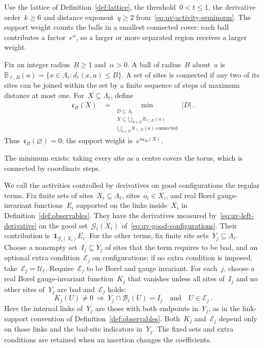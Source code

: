 Use the lattice of Definition~\ref{def:lattice}, the threshold~$0<t\le1$, the derivative order~$k\ge6$ and distance exponent~$q\ge2$ from~\eqref{eq:uv-activity-seminorm}.
The support weight counts the balls in a smallest connected cover: each ball contributes a factor~$e^\alpha$, so a larger or more separated region receives a larger weight.

\begin{definition}\label{def:uv-covers}
Fix an integer radius~$B\ge1$ and~$\alpha>0$.
A ball of radius~$B$ about~$a$ is~$\mathbb B_{\ell,B}(a)=\{x\in\Lambda_\ell:d_\ell(x,a)\le B\}$.
A set of sites is connected if any two of its sites can be joined within the set by a finite sequence of steps of maximum distance at most one.
For~$X\subseteq\Lambda_\ell$, define
\begin{equation}\label{eq:uv-cover-number}
 \begin{aligned}
 \mathfrak c_B(X)&=\min_{\substack{D\subseteq\Lambda_\ell\\
                    X\subseteq\bigcup_{a\in D}\mathbb B_{\ell,B}(a)\\
                    \bigcup_{a\in D}\mathbb B_{\ell,B}(a)\ \mathrm{connected}}}|D|\,.
 \end{aligned}
\end{equation}
Thus~$\mathfrak c_B(\varnothing)=0$; the support weight is~$e^{\alpha\mathfrak c_B(X)}$.
\end{definition}

The minimum exists: taking every site as a centre covers the torus, which is connected by coordinate steps.

We call the activities controlled by derivatives on good configurations the regular terms.
Fix finite sets of sites~$X_i\subseteq\Lambda_\ell$, sites~$o_i\in X_i$, and real Borel gauge-invariant functions~$E_i$ supported on the links inside~$X_i$ in Definition~\ref{def:observables}.
They have the derivatives measured by~\eqref{eq:uv-left-derivative} on the good set~$\mathcal G_t(X_i)$ of~\eqref{eq:uv-good-configurations}.
Their contribution is~$\mathbf1_{\mathcal G_t(X_i)}E_i$.
For the other terms, fix finite site sets~$Y_j\subseteq\Lambda_\ell$. Choose a nonempty set~$I_j\subseteq Y_j$ of sites that the term requires to be bad, and an optional extra condition~$\mathcal E_j$ on configurations; if no extra condition is imposed, take~$\mathcal E_j=\mathcal U_\ell$. Require~$\mathcal E_j$ to be Borel and gauge invariant. For each~$j$, choose a real Borel gauge-invariant function~$K_j$ that vanishes unless all sites of~$I_j$ and no other sites of~$Y_j$ are bad and~$\mathcal E_j$ holds:
\begin{equation}\label{eq:uv-forced-eligibility}
 K_j(U)\ne0\ \Longrightarrow\ Y_j\cap\mathcal B_t(U)=I_j
 \quad\text{and}\quad U\in\mathcal E_j\,.
\end{equation}
Here the internal links of~$Y_j$ are those with both endpoints in~$Y_j$, as in the link-support convention of Definition~\ref{def:observables}. Both~$K_j$ and~$\mathcal E_j$ depend only on those links and the bad-site indicators in~$Y_j$.
The fixed sets and extra conditions are retained when an insertion changes the coefficients.

